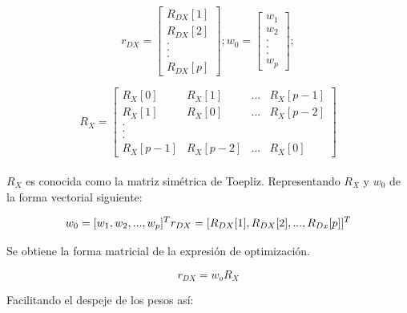 \begin{equation} \label{capcuatro_cuarentayocho}
	 r_{DX}= \left[
	 \begin{array}{c}
     R_{DX}[1]\\
     R_{DX}[2]\\
     .\\
     .\\
     .\\
     R_{DX}[p]
     \end{array}
     \right];
     w_{0}= \left[
	 \begin{array}{c}
     w_{1}\\
     w_{2}\\
     .\\
     .\\
     .\\
     w_{p}
     \end{array}
     \right];
\end{equation}

\begin{equation} \label{capcuatro_cuarentaynueve}
	 R_X= \left[
	 \begin{array}{cccc}
     R_X[0] & R_X[1] & ... & R_X[p-1]\\
     R_X[1] & R_X[0] & ... & R_X[p-2]\\
     .\\
     .\\
     .\\
     R_X[p-1] & R_X[p-2] & ... & R_X[0]
     \end{array}
     \right]
\end{equation}
\\
$R_X$ es conocida como la matriz simétrica de Toepliz. Representando $R_X$ y $w_0$ de la forma vectorial siguiente:

\begin{equation} \label{capcuatro_cincuenta}
w_{0} = [w_1 , w_2, ... , w_p]^{T} \\
r_{DX} = [R_{DX}[1], R_{DX}[2], ... , R_{Dx}[p]]^{T}   \\
\end{equation}

Se obtiene la forma matricial de la expresión de optimización.

\begin{equation} \label{capcuatro_cincuentayuno}
	 r_{DX}=w_oR_X
\end{equation}

Facilitando el despeje de los pesos así: \\

